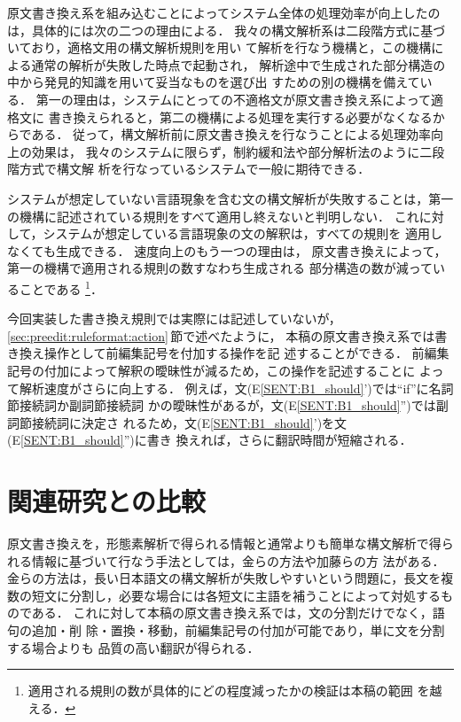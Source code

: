 原文書き換え系を組み込むことによってシステム全体の処理効率が向上したの
は，具体的には次の二つの理由による．
我々の構文解析系は二段階方式に基づいており，適格文用の構文解析規則を用い
て解析を行なう機構と，この機構による通常の解析が失敗した時点で起動され，
解析途中で生成された部分構造の中から発見的知識を用いて妥当なものを選び出
すための別の機構を備えている．
第一の理由は，システムにとっての不適格文が原文書き換え系によって適格文に
書き換えられると，第二の機構による処理を実行する必要がなくなるからである．
従って，構文解析前に原文書き換えを行なうことによる処理効率向上の効果は，
我々のシステムに限らず，制約緩和法や部分解析法のように二段階方式で構文解
析を行なっているシステムで一般に期待できる．

システムが想定していない言語現象を含む文の構文解析が失敗することは，第一
の機構に記述されている規則をすべて適用し終えないと判明しない．
これに対して，システムが想定している言語現象の文の解釈は，すべての規則を
適用しなくても生成できる．
速度向上のもう一つの理由は，
原文書き換えによって，第一の機構で適用される規則の数すなわち生成される
部分構造の数が減っていることである
\footnote{適用される規則の数が具体的にどの程度減ったかの検証は本稿の範囲
を越える．}．

今回実装した書き換え規則では実際には記述していないが，
\ref{sec:preedit:ruleformat:action}\,節で述べたように，
本稿の原文書き換え系では書き換え操作として前編集記号を付加する操作を記
述することができる．
前編集記号の付加によって解釈の曖昧性が減るため，この操作を記述することに
よって解析速度がさらに向上する．
例えば，文(E\ref{SENT:B1_should}')では``if''に名詞節接続詞か副詞節接続詞
かの曖昧性があるが，文(E\ref{SENT:B1_should}'')では副詞節接続詞に決定さ
れるため，文(E\ref{SENT:B1_should}')を文(E\ref{SENT:B1_should}'')に書き
換えれば，さらに翻訳時間が短縮される．

\section{関連研究との比較}
\label{sec:relatedworks}

原文書き換えを，形態素解析で得られる情報と通常よりも簡単な構文解析で得ら
れる情報に基づいて行なう手法としては，金らの方法\cite{Kim94}や加藤らの方
法\cite{KatoTerumasa97}がある．
金らの方法は，長い日本語文の構文解析が失敗しやすいという問題に，長文を複
数の短文に分割し，必要な場合には各短文に主語を補うことによって対処するも
のである．
これに対して本稿の原文書き換え系では，文の分割だけでなく，語句の追加・削
除・置換・移動，前編集記号の付加が可能であり，単に文を分割する場合よりも
品質の高い翻訳が得られる．

